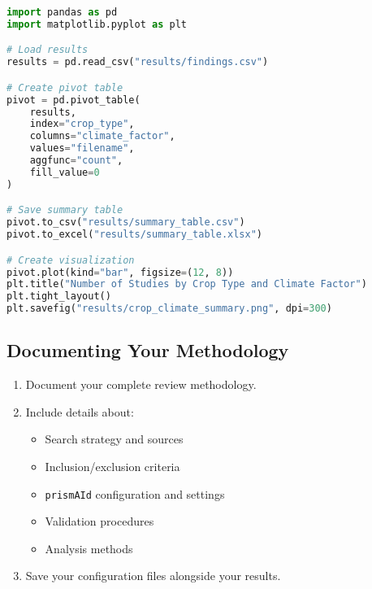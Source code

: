 \begin{commandbox}
\begin{lstlisting}[language=Python]
import pandas as pd
import matplotlib.pyplot as plt

# Load results
results = pd.read_csv("results/findings.csv")

# Create pivot table
pivot = pd.pivot_table(
    results,
    index="crop_type",
    columns="climate_factor",
    values="filename",
    aggfunc="count",
    fill_value=0
)

# Save summary table
pivot.to_csv("results/summary_table.csv")
pivot.to_excel("results/summary_table.xlsx")

# Create visualization
pivot.plot(kind="bar", figsize=(12, 8))
plt.title("Number of Studies by Crop Type and Climate Factor")
plt.tight_layout()
plt.savefig("results/crop_climate_summary.png", dpi=300)
\end{lstlisting}
\end{commandbox}


\subsection{Documenting Your Methodology}

\begin{enumerate}
    \item Document your complete review methodology.
    \item Include details about:
    \begin{itemize}
        \item Search strategy and sources
        \item Inclusion/exclusion criteria
        \item \texttt{prismAId} configuration and settings
        \item Validation procedures
        \item Analysis methods
    \end{itemize}
    \item Save your configuration files alongside your results.
\end{enumerate}


